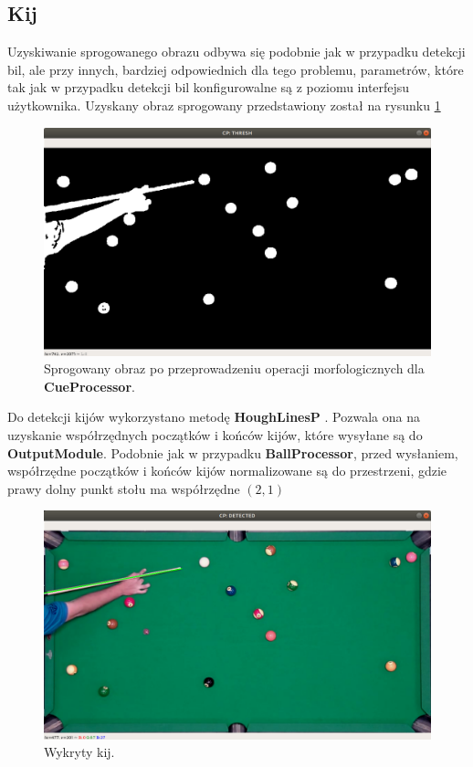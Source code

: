 \documentclass[12pt]{article}
\begin{document}
\subsection{Kij}

Uzyskiwanie sprogowanego obrazu odbywa się podobnie jak w przypadku detekcji bil, ale przy innych, bardziej odpowiednich dla tego problemu, parametrów, które tak jak w przypadku detekcji bil konfigurowalne są z poziomu interfejsu użytkownika. Uzyskany obraz sprogowany przedstawiony został na rysunku \ref{cp_thresh}

\begin{figure}[!htb]
    \centering
    \includegraphics[width=15cm]{./images/obrazki/cp/cp_thresh.png}
    \caption{Sprogowany obraz po przeprowadzeniu operacji morfologicznych dla \textbf{CueProcessor}.}
    \label{cp_thresh}
\end{figure}

\newpage

Do detekcji kijów wykorzystano metodę \textbf{HoughLinesP} \cite{HoughLinesP}. Pozwala ona na uzyskanie współrzędnych początków i końców kijów, które wysyłane są do \textbf{OutputModule}. Podobnie jak w przypadku \textbf{BallProcessor}, przed wysłaniem, współrzędne początków i końców kijów normalizowane są do przestrzeni, gdzie prawy dolny punkt stołu ma współrzędne $(2, 1)$

\begin{figure}[!htb]
    \centering
    \includegraphics[width=15cm]{./images/obrazki/cp/cue_detected.png}
    \caption{Wykryty kij.}
    \label{cue_detected}
\end{figure}
\end{document}
